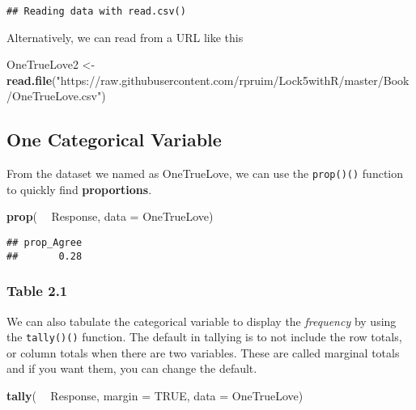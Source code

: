 \documentclass[]{book}
\newenvironment{Shaded}{\begin{snugshade}}{\end{snugshade}}
\newcommand{\DataTypeTok}[1]{\textcolor[rgb]{0.13,0.29,0.53}{#1}}
\newcommand{\KeywordTok}[1]{\textcolor[rgb]{0.13,0.29,0.53}{\textbf{#1}}}
\newcommand{\NormalTok}[1]{#1}
\newcommand{\OperatorTok}[1]{\textcolor[rgb]{0.81,0.36,0.00}{\textbf{#1}}}
\newcommand{\OtherTok}[1]{\textcolor[rgb]{0.56,0.35,0.01}{#1}}
\newcommand{\StringTok}[1]{\textcolor[rgb]{0.31,0.60,0.02}{#1}}
\begin{document}
\begin{verbatim}
## Reading data with read.csv()
\end{verbatim}

Alternatively, we can read from a URL like this

\begin{Shaded}
\begin{Highlighting}[]
\NormalTok{OneTrueLove2 <-}\StringTok{ }
\StringTok{  }\KeywordTok{read.file}\NormalTok{(}\StringTok{"https://raw.githubusercontent.com/rpruim/Lock5withR/master/Book/OneTrueLove.csv"}\NormalTok{)}
\end{Highlighting}
\end{Shaded}

\hypertarget{one-categorical-variable}{%
\subsection{One Categorical Variable}\label{one-categorical-variable}}

From the dataset we named as {OneTrueLove}, we can use the \texttt{prop()()} function to quickly find \textbf{proportions}.

\begin{Shaded}
\begin{Highlighting}[]
\KeywordTok{prop}\NormalTok{( }\OperatorTok{~}\StringTok{ }\NormalTok{Response, }\DataTypeTok{data =}\NormalTok{ OneTrueLove)}
\end{Highlighting}
\end{Shaded}

\begin{verbatim}
## prop_Agree 
##       0.28
\end{verbatim}

\hypertarget{table-2.1}{%
\subsubsection{Table 2.1}\label{table-2.1}}

We can also tabulate the categorical variable to display the \emph{frequency} by using the \texttt{tally()()} function. The default in tallying is to not include the row totals, or column totals when there are two variables. These are called marginal totals and if you want them, you can change the default.

\begin{Shaded}
\begin{Highlighting}[]
\KeywordTok{tally}\NormalTok{( }\OperatorTok{~}\StringTok{ }\NormalTok{Response, }\DataTypeTok{margin =} \OtherTok{TRUE}\NormalTok{, }\DataTypeTok{data =}\NormalTok{ OneTrueLove)}
\end{Highlighting}
\end{Shaded}
\end{document}
